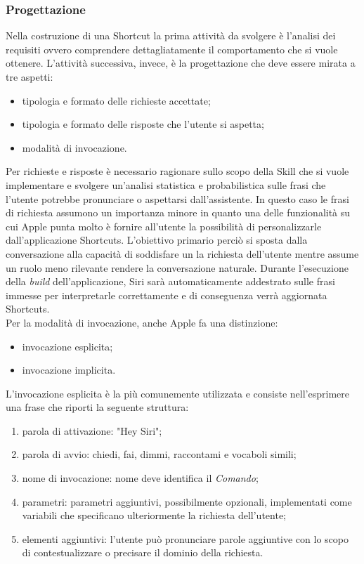 		\subsubsection{Progettazione}
		Nella costruzione di una Shortcut la prima attività da svolgere è l'analisi dei requisiti ovvero comprendere dettagliatamente il comportamento che si vuole ottenere. L'attività successiva, invece, è la progettazione che deve essere mirata a tre aspetti:
		\begin{itemize}
			\item tipologia e formato delle richieste accettate;
			\item tipologia e formato delle risposte che l'utente si aspetta;
			\item modalità di invocazione.
		\end{itemize}
		Per richieste e risposte è necessario ragionare sullo scopo della Skill che si vuole implementare e svolgere un'analisi statistica e probabilistica sulle frasi che l'utente potrebbe pronunciare o aspettarsi dall'assistente. In questo caso le frasi di richiesta assumono un importanza minore in quanto una delle funzionalità su cui Apple punta molto è fornire all'utente la possibilità di personalizzarle dall'applicazione Shortcuts. L'obiettivo primario perciò si sposta dalla conversazione alla capacità di soddisfare un la richiesta dell'utente mentre assume un ruolo meno rilevante rendere la conversazione naturale. Durante l'esecuzione della \textit{build} dell'applicazione, Siri sarà automaticamente addestrato sulle frasi immesse per interpretarle correttamente e di conseguenza verrà aggiornata Shortcuts. \\
		Per la modalità di invocazione, anche Apple fa una distinzione:
		\begin{itemize}
			\item invocazione esplicita;
			\item invocazione implicita.
		\end{itemize}
		L'invocazione esplicita è la più comunemente utilizzata e consiste nell'esprimere una frase che riporti la seguente struttura:
		\begin{enumerate}
			\item parola di attivazione: "Hey Siri";
			\item parola di avvio: chiedi, fai, dimmi, raccontami e vocaboli simili;
			\item nome di invocazione: nome deve identifica il \textit{Comando};
			\item parametri: parametri aggiuntivi, possibilmente opzionali, implementati come variabili che specificano ulteriormente la richiesta dell'utente;
			\item elementi aggiuntivi: l'utente può pronunciare parole aggiuntive con lo scopo di contestualizzare o precisare il dominio della richiesta.
		\end{enumerate}
